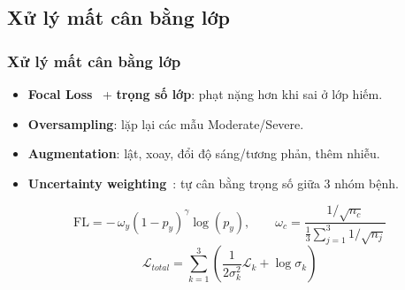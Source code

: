 \documentclass{beamer}
\numberwithin{figure}{section}
\numberwithin{table}{section}
\begin{document}
\subsection{Xử lý mất cân bằng lớp}
\begin{frame}
\frametitle{Xử lý mất cân bằng lớp}
\begin{itemize}
    \item[--] \textbf{Focal Loss}~\cite{lin2017focal} + \textbf{trọng số lớp}: phạt nặng hơn khi sai ở lớp hiếm.
    \item[--] \textbf{Oversampling}: lặp lại các mẫu Moderate/Severe.
    \item[--] \textbf{Augmentation}: lật, xoay, đổi độ sáng/tương phản, thêm nhiễu.
    \item[--] \textbf{Uncertainty weighting}~\cite{kendall2018multitask}: tự cân bằng trọng số giữa 3 nhóm bệnh.
\end{itemize}
\vspace{4pt}
\begin{equation*}
\text{FL} = -\,\omega_y (1 - p_y)^\gamma \log(p_y), \qquad
\omega_c = \frac{1/\sqrt{n_c}}{\frac{1}{3}\sum_{j=1}^{3} 1/\sqrt{n_j}}
\end{equation*}
\begin{equation*}
\mathcal{L}_{total} = \sum_{k=1}^{3} \left( \frac{1}{2 \sigma_k^2} \mathcal{L}_k + \log \sigma_k \right)
\end{equation*}
\end{frame}
\end{document}
